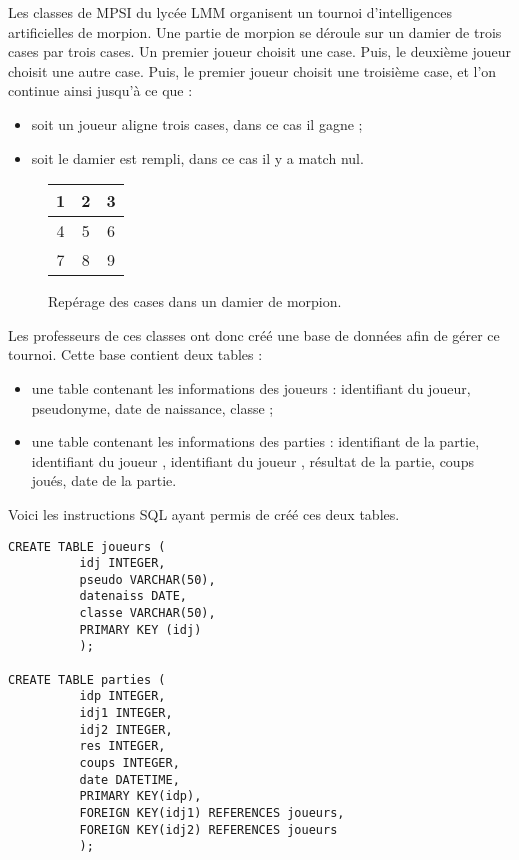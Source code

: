 Les classes de MPSI du lycée LMM organisent un tournoi d'intelligences artificielles de morpion. 
Une partie de morpion se déroule sur un damier de trois cases par trois cases. Un premier joueur choisit une case. 
Puis, le deuxième joueur choisit une autre case. 
Puis, le premier joueur choisit une troisième case, et l'on continue ainsi jusqu'à ce que :
\begin{itemize}
  \item soit un joueur aligne trois cases, dans ce cas il gagne ;
  \item soit le damier est rempli, dans ce cas il y a match nul. 
\end{itemize}
\begin{figure}[!h]
  \begin{center}
    \begin{tabular}{|c|c|c|}
      \hline
      1 & 2 & 3 \\
      \hline
      4 & 5 & 6 \\
      \hline
      7 & 8 & 9 \\
      \hline
    \end{tabular}
    \caption{Repérage des cases dans un damier de morpion.}
    \label{morpion:cases}
  \end{center}
\end{figure}
Les professeurs de ces classes ont donc créé une base de données afin de gérer ce tournoi. 
Cette base contient deux tables : 
\begin{itemize}
  \item une table contenant les informations des joueurs : identifiant du joueur, pseudonyme, date de naissance, classe ; 
  \item une table contenant les informations des parties : identifiant de la partie, identifiant du joueur , identifiant du joueur , résultat de la partie, coups joués, date de la partie. 
\end{itemize}
Voici les instructions SQL ayant permis de créé ces deux tables. 
\begin{verbatim}
CREATE TABLE joueurs (
          idj INTEGER,
          pseudo VARCHAR(50),
          datenaiss DATE,
          classe VARCHAR(50),
          PRIMARY KEY (idj)
          );

CREATE TABLE parties (
          idp INTEGER,
          idj1 INTEGER, 
          idj2 INTEGER,
          res INTEGER,
          coups INTEGER,
          date DATETIME,
          PRIMARY KEY(idp),
          FOREIGN KEY(idj1) REFERENCES joueurs,
          FOREIGN KEY(idj2) REFERENCES joueurs
          );
\end{verbatim}
